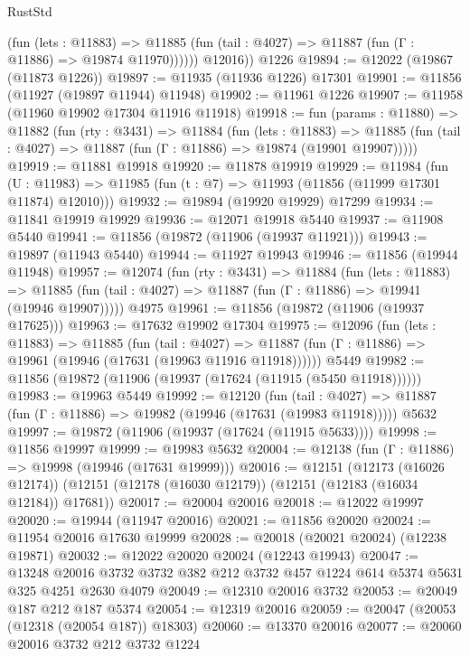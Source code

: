 \begin{lexlean}{RustStd}
\begin{coremodule}
              (fun (lets : @11883) =>
              @11885 (fun (tail : @4027) => @11887 (fun (Γ : @11886) => @19874 @11970))))))
        @12016))
    @1226
@19894 := @12022 (@19867 (@11873 @1226))
@19897 := @11935 (@11936 @1226) @17301
@19901 := @11856 (@11927 (@19897 @11944) @11948)
@19902 := @11961 @1226
@19907 := @11958 (@11960 @19902 @17304 @11916 @11918)
@19918 := fun (params : @11880) =>
  @11882
    (fun (rty : @3431) =>
    @11884
      (fun (lets : @11883) =>
      @11885 (fun (tail : @4027) => @11887 (fun (Γ : @11886) => @19874 (@19901 @19907)))))
@19919 := @11881 @19918
@19920 := @11878 @19919
@19929 := @11984
    (fun (U : @11983) => @11985 (fun (t : @7) => @11993 (@11856 (@11999 @17301 @11874) @12010)))
@19932 := @19894 (@19920 @19929) @17299
@19934 := @11841 @19919 @19929
@19936 := @12071 @19918 @5440
@19937 := @11908 @5440
@19941 := @11856 (@19872 (@11906 (@19937 @11921)))
@19943 := @19897 (@11943 @5440)
@19944 := @11927 @19943
@19946 := @11856 (@19944 @11948)
@19957 := @12074
    (fun (rty : @3431) =>
    @11884
      (fun (lets : @11883) =>
      @11885 (fun (tail : @4027) => @11887 (fun (Γ : @11886) => @19941 (@19946 @19907)))))
    @4975
@19961 := @11856 (@19872 (@11906 (@19937 @17625)))
@19963 := @17632 @19902 @17304
@19975 := @12096
    (fun (lets : @11883) =>
    @11885
      (fun (tail : @4027) =>
      @11887 (fun (Γ : @11886) => @19961 (@19946 (@17631 (@19963 @11916 @11918))))))
    @5449
@19982 := @11856 (@19872 (@11906 (@19937 (@17624 (@11915 (@5450 @11918))))))
@19983 := @19963 @5449
@19992 := @12120
    (fun (tail : @4027) => @11887 (fun (Γ : @11886) => @19982 (@19946 (@17631 (@19983 @11918)))))
    @5632
@19997 := @19872 (@11906 (@19937 (@17624 (@11915 @5633))))
@19998 := @11856 @19997
@19999 := @19983 @5632
@20004 := @12138 (fun (Γ : @11886) => @19998 (@19946 (@17631 @19999)))
@20016 := @12151
    (@12173 (@16026 @12174))
    (@12151 (@12178 (@16030 @12179)) (@12151 (@12183 (@16034 @12184)) @17681))
@20017 := @20004 @20016
@20018 := @12022 @19997
@20020 := @19944 (@11947 @20016)
@20021 := @11856 @20020
@20024 := @11954 @20016 @17630 @19999
@20028 := @20018 (@20021 @20024) (@12238 @19871)
@20032 := @12022 @20020 @20024 (@12243 @19943)
@20047 := @13248
    @20016
    @3732
    @3732
    @382
    @212
    @3732
    @457
    @1224
    @614
    @5374
    @5631
    @325
    @4251
    @2630
    @4079
@20049 := @12310 @20016 @3732
@20053 := @20049 @187 @212 @187 @5374
@20054 := @12319 @20016
@20059 := @20047 (@20053 (@12318 (@20054 @187)) @18303)
@20060 := @13370 @20016
@20077 := @20060
    @20016
    @3732
    @212
    @3732
    @1224

\end{coremodule}
\end{lexlean}
